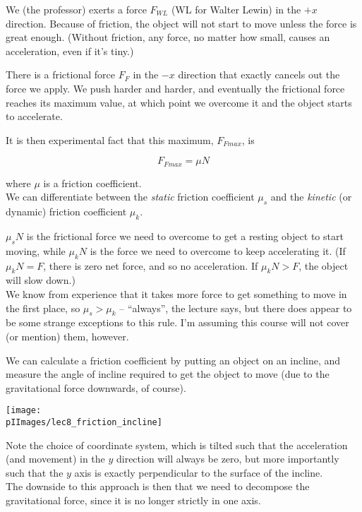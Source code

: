 We (the professor) exerts a force $F_{WL}$ (WL for Walter Lewin) in the $+x$ direction. Because of friction, the object will not start to move unless the force is great enough. (Without friction, any force, no matter how small, causes an acceleration, even if it's tiny.)

There is a frictional force $F_F$ in the $-x$ direction that exactly cancels out the force we apply. We push harder and harder, and eventually the frictional force reaches its maximum value, at which point we overcome it and the object starts to accelerate.

It is then experimental fact that this maximum, $F_{Fmax}$, is

\begin{equation}
F_{Fmax} = \mu N
\end{equation}

where $\mu$ is a friction coefficient.\\
We can differentiate between the \emph{static} friction coefficient $\mu_s$ and the \emph{kinetic} (or dynamic) friction coefficient $\mu_k$.

$\mu_s N$ is the frictional force we need to overcome to get a resting object to start moving, while $\mu_k N$ is the force we need to overcome to keep accelerating it. (If $\mu_k N = F$, there is zero net force, and so no acceleration. If $\mu_k N > F$, the object will slow down.)\\
We know from experience that it takes more force to get something to move in the first place, so $\mu_s > \mu_k$ -- ``always'', the lecture says, but there does appear to be some strange exceptions to this rule. I'm assuming this course will not cover (or mention) them, however.

We can calculate a friction coefficient by putting an object on an incline, and measure the angle of incline required to get the object to move (due to the gravitational force downwards, of course).

\begin{center}
\texttt{[image: \\pIImages/lec8\_friction\_incline]}
\end{center}

Note the choice of coordinate system, which is tilted such that the acceleration (and movement) in the $y$ direction will always be zero, but more importantly such that the $y$ axis is exactly perpendicular to the surface of the incline.\\
The downside to this approach is then that we need to decompose the gravitational force, since it is no longer strictly in one axis.

